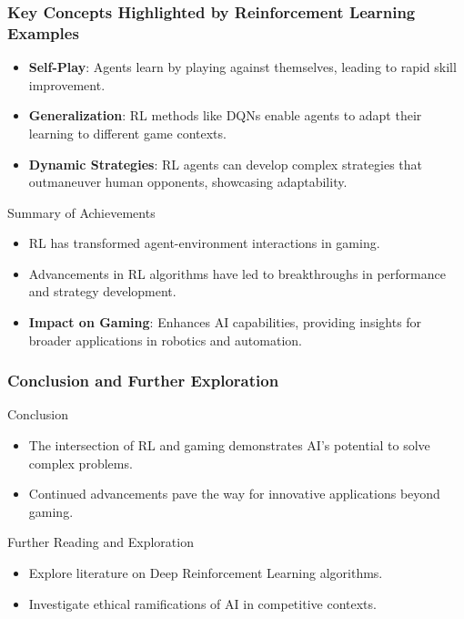 \documentclass[aspectratio=169]{beamer}
\begin{document}
\begin{frame}[fragile]
  \frametitle{Key Concepts Highlighted by Reinforcement Learning Examples}
  \begin{itemize}
    \item \textbf{Self-Play}: Agents learn by playing against themselves, leading to rapid skill improvement.
    \item \textbf{Generalization}: RL methods like DQNs enable agents to adapt their learning to different game contexts.
    \item \textbf{Dynamic Strategies}: RL agents can develop complex strategies that outmaneuver human opponents, showcasing adaptability.
  \end{itemize}
  
  \begin{block}{Summary of Achievements}
    \begin{itemize}
      \item RL has transformed agent-environment interactions in gaming.
      \item Advancements in RL algorithms have led to breakthroughs in performance and strategy development.
      \item \textbf{Impact on Gaming}: Enhances AI capabilities, providing insights for broader applications in robotics and automation.
    \end{itemize}
  \end{block}
\end{frame}

\begin{frame}[fragile]
  \frametitle{Conclusion and Further Exploration}
  \begin{block}{Conclusion}
    \begin{itemize}
      \item The intersection of RL and gaming demonstrates AI's potential to solve complex problems.
      \item Continued advancements pave the way for innovative applications beyond gaming.
    \end{itemize}
  \end{block}
  
  \begin{block}{Further Reading and Exploration}
    \begin{itemize}
      \item Explore literature on Deep Reinforcement Learning algorithms.
      \item Investigate ethical ramifications of AI in competitive contexts.
    \end{itemize}
  \end{block}
\end{frame}
\end{document}
